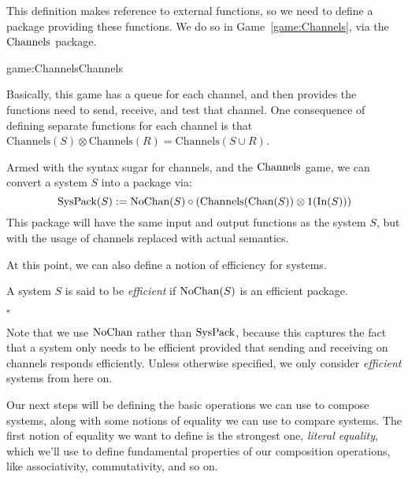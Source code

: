 This definition makes reference to external functions,
so we need to define a package providing these functions.
We do so in Game~\ref{game:Channels},
via the $\text{Channels}$ package.

\begin{game}{game:Channels}{Channels}
\end{game}

Basically, this game has a queue for each channel, and then provides
the functions need to send, receive, and test that channel.
One consequence of defining separate functions for each channel
is that $\text{Channels}(S) \otimes \text{Channels}(R) = \text{Channels}(S \cup R)$.

Armed with the syntax sugar for channels, and the $\text{Channels}$ game,
we can convert a system $S$ into a package via:
$$
\text{SysPack}(S) := \text{NoChan}(S) \circ (\text{Channels}(\text{Chan}(S)) \otimes 1(\text{In}(S)))
$$
This package will have the same input and output functions as the system $S$,
but with the usage of channels replaced with actual semantics.

At this point, we can also define a notion of efficiency for systems.

\begin{definition}
  A system $S$ is said to be \emph{efficient} if $\text{NoChan}(S)$
  is an efficient package.

  $\square$
\end{definition}

Note that we use $\text{NoChan}$ rather than $\text{SysPack}$,
because this captures the fact that a system only needs to be efficient
provided that sending and receiving on channels responds efficiently.
Unless otherwise specified, we only consider \emph{efficient} systems
from here on.

Our next steps will be defining the basic operations we can use
to compose systems, along with some notions of equality we
can use to compare systems.
The first notion of equality we want to define is the strongest
one, \emph{literal equality}, 
which we'll use to define fundamental properties of our composition
operations, like associativity, commutativity, and so on.

